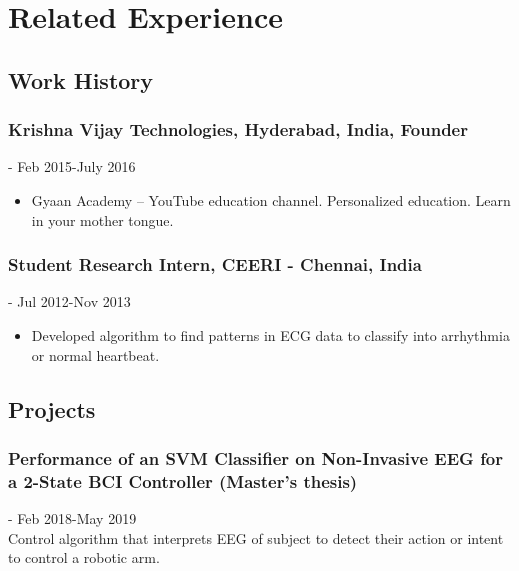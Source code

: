 \documentclass{article}
\begin{document}
\section{Related Experience}
\subsection{Work History}

\subsubsection{Krishna Vijay Technologies, Hyderabad, India, Founder} \hfill - Feb 2015-July 2016
\begin{itemize}
    \item Gyaan Academy -- YouTube education channel. Personalized education. Learn in your mother tongue.
\end{itemize}
    
\subsubsection{Student Research Intern, CEERI - Chennai, India} \hfill - Jul 2012-Nov 2013
\begin{itemize}
    \item Developed algorithm to find patterns in ECG data to classify into arrhythmia or normal heartbeat.
\end{itemize}


\subsection{Projects}
\subsubsection{Performance of an SVM Classifier on Non-Invasive EEG for a 2-State BCI Controller (Master's thesis)} \hfill - Feb 2018-May 2019\\
\noindent
Control algorithm that interprets EEG of subject to detect their action or intent to control a robotic arm.\\
\end{document}
